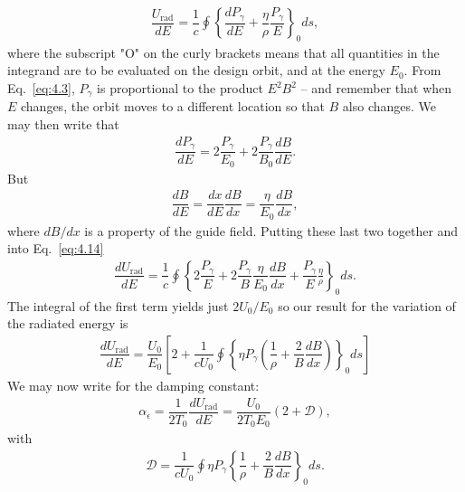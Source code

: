 \begin{align} \label{eq:4.14}
	\dfrac{U_\text{rad}}{dE} = \dfrac{1}{c} \oint \left\lbrace \dfrac{dP_\gamma}{dE} + \dfrac{\eta}{\rho} \dfrac{P_\gamma}{E} \right\rbrace_0 ds,
\end{align}
where the subscript "O" on the curly brackets means that all quantities in the integrand are to be evaluated on the design orbit, and at the energy $E_0$. From Eq.~\eqref{eq:4.3}, $P_\gamma$ is proportional to the product $E^2 B^2$ -- and remember that when $E$ changes, the orbit moves to a different location so that $B$ also changes. We may then write that
\begin{align*}
	\dfrac{dP_\gamma}{dE} = 2 \dfrac{P_\gamma}{E_0} + 2 \dfrac{P_\gamma}{B_0} \dfrac{dB}{dE}.
\end{align*}
But
\begin{align*}
	\dfrac{dB}{dE} = \dfrac{dx}{dE} \dfrac{dB}{dx} = \dfrac{\eta}{E_0} \dfrac{dB}{dx},
\end{align*}
where $dB/dx$ is a property of the guide field. Putting these last two together and into Eq.~\eqref{eq:4.14}
\begin{align*}
	\dfrac{dU_\text{rad}}{dE} = \dfrac{1}{c} \oint \left\lbrace 2 \dfrac{P_\gamma}{E} + 2 \dfrac{P_\gamma}{B} \dfrac{\eta}{E_0} \dfrac{dB}{dx} + \dfrac{P_\gamma}{E} \frac{\eta}{\rho}  \right\rbrace_0 ds.
\end{align*}
The integral
 of the first
 term yields just $2U_0/E_0$ so our result for the variation of the radiated energy is
\begin{align}
	\dfrac{dU_\text{rad}}{dE} = \dfrac{U_0}{E_0} \left[ 2 + \dfrac{1}{cU_0} \oint \left\lbrace \eta P_\gamma \left( \dfrac{1}{\rho} + \dfrac{2}{B} \dfrac{dB}{dx} \right) \right\rbrace_0 ds \right]
\end{align}
We may now write for the damping constant:
\begin{align}\label{eq:4.16}
\alpha_\epsilon = \dfrac{1}{2 T_0} \dfrac{dU_\text{rad}}{dE} = \dfrac{U_0}{2 T_0 E_0} (2 + \mathscr{D}),
\end{align}
with
\begin{align}
	\mathscr{D} = \dfrac{1}{c U_0} \oint \eta P_\gamma \left\lbrace \dfrac{1}{\rho} + \dfrac{2}{B} \dfrac{dB}{dx} \right\rbrace_0 ds.
\end{align}

